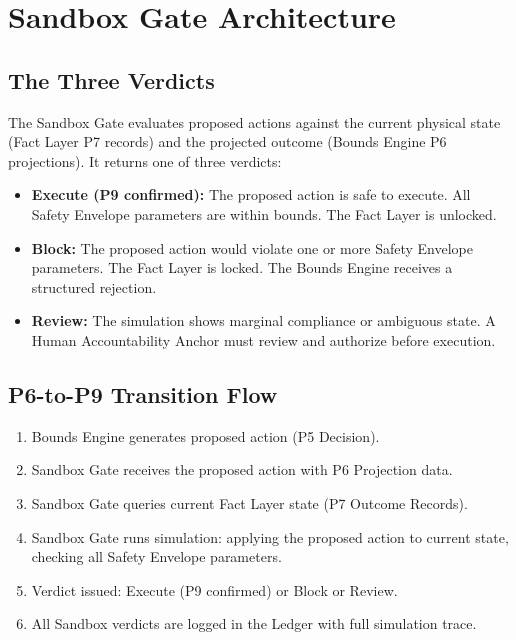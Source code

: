\documentclass[12pt]{article}
\begin{document}
\section{Sandbox Gate Architecture}
\label{sec:architecture}

\subsection{The Three Verdicts}

The Sandbox Gate evaluates proposed actions against the current physical state (Fact Layer P7 records) and the projected outcome (Bounds Engine P6 projections). It returns one of three verdicts:

\begin{itemize}
    \item \textbf{Execute (P9 confirmed):} The proposed action is safe to execute. All Safety Envelope parameters are within bounds. The Fact Layer is unlocked.
    \item \textbf{Block:} The proposed action would violate one or more Safety Envelope parameters. The Fact Layer is locked. The Bounds Engine receives a structured rejection.
    \item \textbf{Review:} The simulation shows marginal compliance or ambiguous state. A Human Accountability Anchor must review and authorize before execution.
\end{itemize}

\subsection{P6-to-P9 Transition Flow}

\begin{enumerate}
    \item Bounds Engine generates proposed action (P5 Decision).
    \item Sandbox Gate receives the proposed action with P6 Projection data.
    \item Sandbox Gate queries current Fact Layer state (P7 Outcome Records).
    \item Sandbox Gate runs simulation: applying the proposed action to current state, checking all Safety Envelope parameters.
    \item Verdict issued: Execute (P9 confirmed) or Block or Review.
    \item All Sandbox verdicts are logged in the Ledger with full simulation trace.
\end{enumerate}
\end{document}
